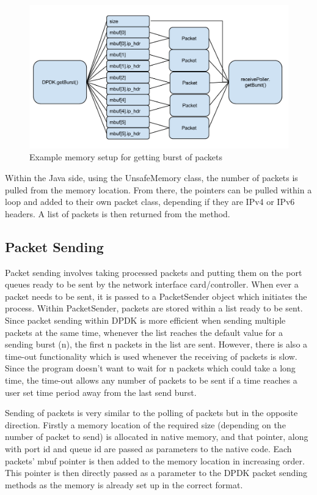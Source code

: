 \documentclass[final_report.tex]{subfiles}
\begin{document}
\begin{figure}[H]
	\centering
	\includegraphics[width=\textwidth]{img/memory.png}
	\caption{Example memory setup for getting burst of packets}
	\label{fig:overview}
\end{figure}

Within the Java side, using the UnsafeMemory class, the number of packets is pulled from the memory location. From there, the pointers can be pulled within a loop and added to their own packet class, depending if they are IPv4 or IPv6 headers. A list of packets is then returned from the method.

\subsection{Packet Sending}
Packet sending involves taking processed packets and putting them on the port queues ready to be sent by the network interface card/controller. When ever a packet needs to be sent, it is passed to a PacketSender object which initiates the process. Within PacketSender, packets are stored within a list ready to be sent. Since packet sending within DPDK is more efficient when sending multiple packets at the same time, whenever the list reaches the default value for a sending burst (n), the first n packets in the list are sent. However, there is also a time-out functionality which is used whenever the receiving of packets is slow. Since the program doesn't want to wait for n packets which could take a long time, the time-out allows any number of packets to be sent if a time reaches a user set time period away from the last send burst.

Sending of packets is very similar to the polling of packets  but in the opposite direction. Firstly a memory location of the required size (depending on the number of packet to send) is allocated in native memory, and that pointer, along with port id and queue id are passed as parameters to the native code. Each packets' mbuf pointer is then added to the memory location in increasing order. This pointer is then directly passed as a parameter to the DPDK packet sending methods as the memory is already set up in the correct format.
\end{document}
